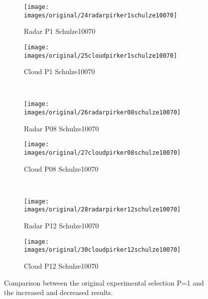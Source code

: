 \begin{figure}[htp] \centering
    \begin{subfigure}[b]{0.48\columnwidth}
        \texttt{[image: images/original/24radarpirker1schulze10070]}
        \caption{Radar P1 Schulze10070}
        \label{fig:24radarpirker1schulze10070}
    \end{subfigure}
    \begin{subfigure}[b]{0.48\columnwidth}
        \texttt{[image: images/original/25cloudpirker1schulze10070]}
        \caption{Cloud P1 Schulze10070}
        \label{fig:25cloudpirker1schulze10070}
    \end{subfigure}\\
        \begin{subfigure}[b]{0.48\columnwidth}
        \texttt{[image: images/original/26radarpirker08schulze10070]}
        \caption{Radar P08 Schulze10070}
        \label{fig:26radarpirker08schulze10070} 
    \end{subfigure}
    \begin{subfigure}[b]{0.48\columnwidth}
        \texttt{[image: images/original/27cloudpirker08schulze10070]}
        \caption{Cloud P08 Schulze10070}
        \label{fig:27cloudpirker08schulze10070} 
    \end{subfigure}\\
        \begin{subfigure}[b]{0.48\columnwidth}
        \texttt{[image: images/original/28radarpirker12schulze10070]}
        \caption{Radar P12 Schulze10070}
        \label{fig:28radarpirker12schulze10070} 
    \end{subfigure}
    \begin{subfigure}[b]{0.48\columnwidth}
        \texttt{[image: images/original/30cloudpirker12schulze10070]}
        \caption{Cloud P12 Schulze10070}
        \label{fig:30cloudpirker12schulze10070} 
    \end{subfigure}
    \caption{Comparison between the original experimental selection P=1 and the
    increased and decreased results.}
    \label{fig:29schulzeradarandcloud}
\end{figure}